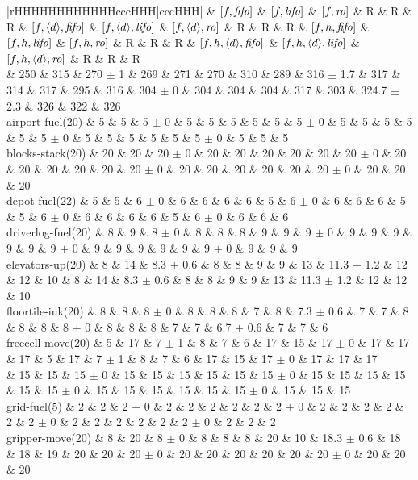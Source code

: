 \begin{center}
\begin{tabular}{|rHHHHHHHHHHHHcccHHH|cccHHH|}
 & \([f,{\text{\textit{fifo}}}]\) & \([f,{\text{\textit{lifo}}}]\) & \([f,{\text{\textit{ro}}}]\) & R & R & R & \([f,{\left<d\right>},{\text{\textit{fifo}}}]\) & \([f,{\left<d\right>},{\text{\textit{lifo}}}]\) & \([f,{\left<d\right>},{\text{\textit{ro}}}]\) & R & R & R & \([f,h,{\text{\textit{fifo}}}]\) & \([f,h,{\text{\textit{lifo}}}]\) & \([f,h,{\text{\textit{ro}}}]\) & R & R & R & \([f,h,{\left<d\right>},{\text{\textit{fifo}}}]\) & \([f,h,{\left<d\right>},{\text{\textit{lifo}}}]\) & \([f,h,{\left<d\right>},{\text{\textit{ro}}}]\) & R & R & R\\
\hline
 & 250 & 315 & 270 \(\pm\) 1 & 269 & 271 & 270 & 310 & 289 & 316 \(\pm\) 1.7 & 317 & 314 & 317 & 295 & 316 & 304 \(\pm\) 0 & 304 & 304 & 304 & 317 & 303 & 324.7 \(\pm\) 2.3 & 326 & 322 & 326\\
\hline
airport-fuel(20) & 5 & 5 & 5 \(\pm\) 0 & 5 & 5 & 5 & 5 & 5 & 5 \(\pm\) 0 & 5 & 5 & 5 & 5 & 5 & 5 \(\pm\) 0 & 5 & 5 & 5 & 5 & 5 & 5 \(\pm\) 0 & 5 & 5 & 5\\
blocks-stack(20) & 20 & 20 & 20 \(\pm\) 0 & 20 & 20 & 20 & 20 & 20 & 20 \(\pm\) 0 & 20 & 20 & 20 & 20 & 20 & 20 \(\pm\) 0 & 20 & 20 & 20 & 20 & 20 & 20 \(\pm\) 0 & 20 & 20 & 20\\
depot-fuel(22) & 5 & 5 & 6 \(\pm\) 0 & 6 & 6 & 6 & 6 & 5 & 6 \(\pm\) 0 & 6 & 6 & 6 & 5 & 5 & 6 \(\pm\) 0 & 6 & 6 & 6 & 6 & 5 & 6 \(\pm\) 0 & 6 & 6 & 6\\
driverlog-fuel(20) & 8 & 9 & 8 \(\pm\) 0 & 8 & 8 & 8 & 9 & 9 & 9 \(\pm\) 0 & 9 & 9 & 9 & 9 & 9 & 9 \(\pm\) 0 & 9 & 9 & 9 & 9 & 9 & 9 \(\pm\) 0 & 9 & 9 & 9\\
elevators-up(20) & 8 & 14 & 8.3 \(\pm\) 0.6 & 8 & 8 & 9 & 9 & 13 & 11.3 \(\pm\) 1.2 & 12 & 12 & 10 & 8 & 14 & 8.3 \(\pm\) 0.6 & 8 & 8 & 9 & 9 & 13 & 11.3 \(\pm\) 1.2 & 12 & 12 & 10\\
floortile-ink(20) & 8 & 8 & 8 \(\pm\) 0 & 8 & 8 & 8 & 7 & 8 & 7.3 \(\pm\) 0.6 & 7 & 7 & 8 & 8 & 8 & 8 \(\pm\) 0 & 8 & 8 & 8 & 7 & 7 & 6.7 \(\pm\) 0.6 & 7 & 7 & 6\\
freecell-move(20) & 5 & 17 & 7 \(\pm\) 1 & 8 & 7 & 6 & 17 & 15 & 17 \(\pm\) 0 & 17 & 17 & 17 & 5 & 17 & 7 \(\pm\) 1 & 8 & 7 & 6 & 17 & 15 & 17 \(\pm\) 0 & 17 & 17 & 17\\
 & 15 & 15 & 15 \(\pm\) 0 & 15 & 15 & 15 & 15 & 15 & 15 \(\pm\) 0 & 15 & 15 & 15 & 15 & 15 & 15 \(\pm\) 0 & 15 & 15 & 15 & 15 & 15 & 15 \(\pm\) 0 & 15 & 15 & 15\\
grid-fuel(5) & 2 & 2 & 2 \(\pm\) 0 & 2 & 2 & 2 & 2 & 2 & 2 \(\pm\) 0 & 2 & 2 & 2 & 2 & 2 & 2 \(\pm\) 0 & 2 & 2 & 2 & 2 & 2 & 2 \(\pm\) 0 & 2 & 2 & 2\\
gripper-move(20) & 8 & 20 & 8 \(\pm\) 0 & 8 & 8 & 8 & 20 & 10 & 18.3 \(\pm\) 0.6 & 18 & 18 & 19 & 20 & 20 & 20 \(\pm\) 0 & 20 & 20 & 20 & 20 & 20 & 20 \(\pm\) 0 & 20 & 20 & 20\\

\end{tabular}
\end{center}

